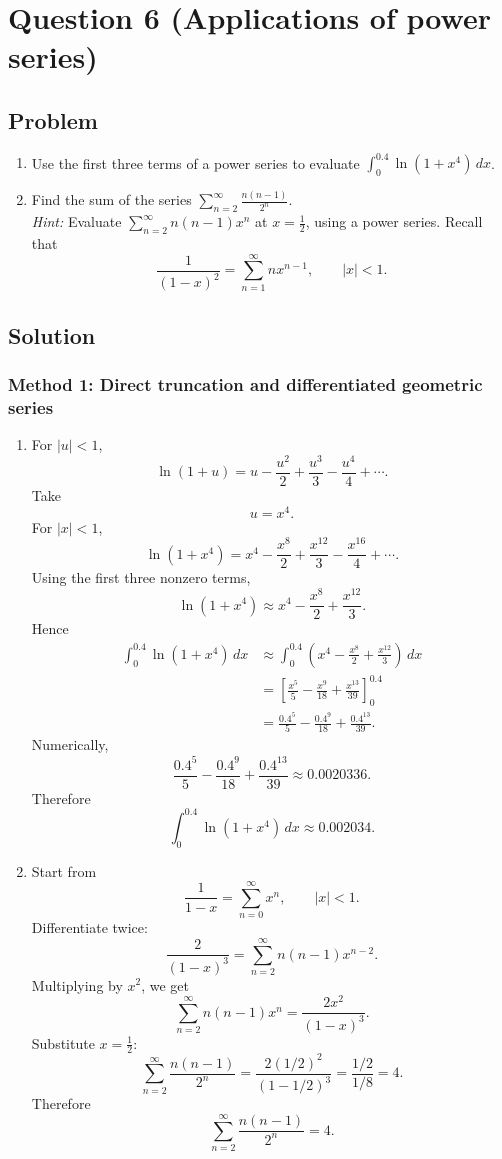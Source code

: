 \documentclass[12pt]{article}
\newcommand{\ds}{\displaystyle}
\begin{document}
\newpage
\section*{Question 6 (Applications of power series)}
\subsection*{Problem}
\begin{enumerate}[label=(\alph*)]
  \item Use the first three terms of a power series to evaluate \(\ds \int_0^{0.4}\ln(1+x^4)\,dx\).
  \item Find the sum of the series \(\ds \sum_{n=2}^{\infty}\frac{n(n-1)}{2^n}\). \\
  \emph{Hint:} Evaluate \(\sum_{n=2}^{\infty}n(n-1)x^n\) at \(x=\frac12\), using a power series. Recall that
  \[
  \frac{1}{(1-x)^2}=\sum_{n=1}^{\infty}n x^{n-1},\qquad |x|<1.
  \]
\end{enumerate}

\subsection*{Solution}

\subsubsection*{Method 1: Direct truncation and differentiated geometric series}
\begin{enumerate}[label=(\alph*)]
\item For \(|u|<1\),
\[
\ln(1+u)=u-\frac{u^2}{2}+\frac{u^3}{3}-\frac{u^4}{4}+\cdots.
\]
Take
\[
u=x^4.
\]
For \(|x|<1\),
\[
\ln(1+x^4)
=
x^4-\frac{x^8}{2}+\frac{x^{12}}{3}-\frac{x^{16}}4+\cdots.
\]
Using the first three nonzero terms,
\[
\ln(1+x^4)
\approx
x^4-\frac{x^8}{2}+\frac{x^{12}}3.
\]
Hence
\begin{align*}
\int_0^{0.4}\ln(1+x^4)\,dx
&\approx
\int_0^{0.4}\left(x^4-\frac{x^8}{2}+\frac{x^{12}}3\right)\,dx\\
&=
\left[\frac{x^5}{5}-\frac{x^9}{18}+\frac{x^{13}}{39}\right]_0^{0.4}\\
&=
\frac{0.4^5}{5}-\frac{0.4^9}{18}+\frac{0.4^{13}}{39}.
\end{align*}
Numerically,
\[
\frac{0.4^5}{5}-\frac{0.4^9}{18}+\frac{0.4^{13}}{39}
\approx
0.0020336.
\]
Therefore
\[
\boxed{
\int_0^{0.4}\ln(1+x^4)\,dx
\approx 0.002034.
}
\]

\item Start from
\[
\frac1{1-x}=\sum_{n=0}^{\infty}x^n,
\qquad |x|<1.
\]
Differentiate twice:
\[
\frac2{(1-x)^3}
=
\sum_{n=2}^{\infty}n(n-1)x^{n-2}.
\]
Multiplying by \(x^2\), we get
\[
\sum_{n=2}^{\infty}n(n-1)x^n
=
\frac{2x^2}{(1-x)^3}.
\]
Substitute \(x=\frac12\):
\[
\sum_{n=2}^{\infty}\frac{n(n-1)}{2^n}
=
\frac{2(1/2)^2}{(1-1/2)^3}
=
\frac{1/2}{1/8}
=
4.
\]
Therefore
\[
\boxed{
\sum_{n=2}^{\infty}\frac{n(n-1)}{2^n}=4.
}
\]
\end{enumerate}
\end{document}
